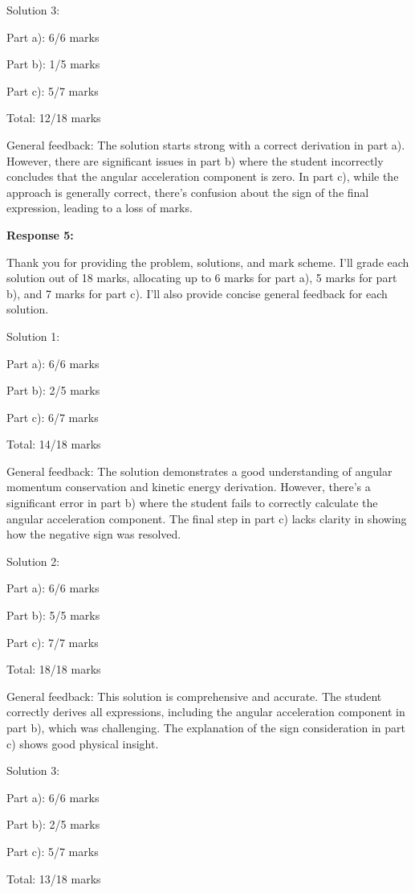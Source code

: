 \documentclass[a4paper,11pt]{article}
\begin{document}
Solution 3:

Part a): 6/6 marks

Part b): 1/5 marks

Part c): 5/7 marks

Total: 12/18 marks

General feedback: The solution starts strong with a correct derivation in part a). However, there are significant issues in part b) where the student incorrectly concludes that the angular acceleration component is zero. In part c), while the approach is generally correct, there's confusion about the sign of the final expression, leading to a loss of marks.

\bigskip
\textbf{Response 5:}

Thank you for providing the problem, solutions, and mark scheme. I'll grade each solution out of 18 marks, allocating up to 6 marks for part a), 5 marks for part b), and 7 marks for part c). I'll also provide concise general feedback for each solution.

Solution 1:

Part a): 6/6 marks

Part b): 2/5 marks

Part c): 6/7 marks

Total: 14/18 marks

General feedback: The solution demonstrates a good understanding of angular momentum conservation and kinetic energy derivation. However, there's a significant error in part b) where the student fails to correctly calculate the angular acceleration component. The final step in part c) lacks clarity in showing how the negative sign was resolved.

Solution 2:

Part a): 6/6 marks

Part b): 5/5 marks

Part c): 7/7 marks

Total: 18/18 marks

General feedback: This solution is comprehensive and accurate. The student correctly derives all expressions, including the angular acceleration component in part b), which was challenging. The explanation of the sign consideration in part c) shows good physical insight.

Solution 3:

Part a): 6/6 marks

Part b): 2/5 marks

Part c): 5/7 marks

Total: 13/18 marks
\end{document}

